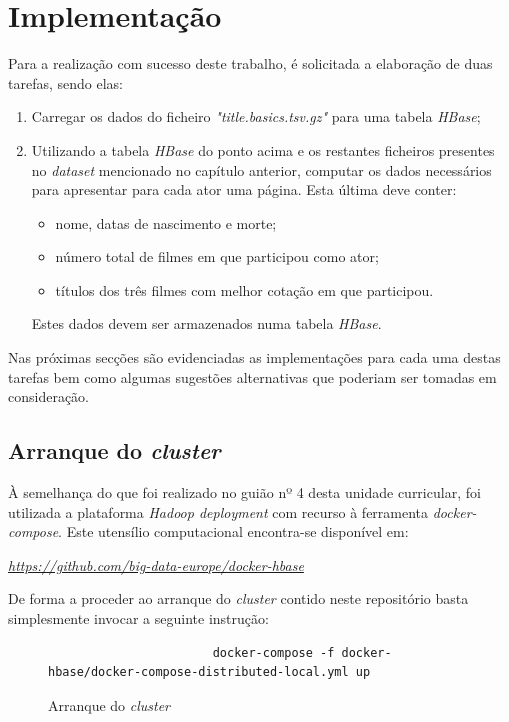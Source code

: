 \documentclass[a4paper]{report}
\begin{document}
\chapter{Implementação} \label{ch:Implementation}
\large {
	Para a realização com sucesso deste trabalho, é solicitada a elaboração de duas tarefas, sendo elas:
	\begin{enumerate}
		\item Carregar os dados do ficheiro \textit{"title.basics.tsv.gz"} para uma tabela \textit{HBase};
		\item Utilizando a tabela \textit{HBase} do ponto acima e os restantes ficheiros presentes no \textit{dataset} mencionado no capítulo anterior, computar os dados necessários para apresentar para cada ator uma página. Esta última deve conter:
		\begin{itemize}
			\item nome, datas de nascimento e morte;
			\item número total de filmes em que participou como ator;
			\item títulos dos três filmes com melhor cotação em que participou.
		\end{itemize}
		Estes dados devem ser armazenados numa tabela \textit{HBase}.
	\end{enumerate}
	
	Nas próximas secções são evidenciadas as implementações para cada uma destas tarefas bem como algumas sugestões alternativas que poderiam ser tomadas em consideração.
	
	\section{Arranque do \textit{cluster}} \label{sec:Cluster}
		À semelhança do que foi realizado no guião nº 4 desta unidade curricular, foi utilizada a plataforma \textit{Hadoop deployment} com recurso à ferramenta \textit{docker-compose}. Este utensílio computacional encontra-se disponível em:
		\begin{center}
			\textit{\url{https://github.com/big-data-europe/docker-hbase}}
		\end{center}

		De forma a proceder ao arranque do \textit{cluster} contido neste repositório basta simplesmente invocar a seguinte instrução:
		\begin{figure}[H]
			{
				\color{teal}
				\begin{verbatim}
				       docker-compose -f docker-hbase/docker-compose-distributed-local.yml up
				\end{verbatim}
			}
			\caption{Arranque do \textit{cluster}}
            \label{fig:1}
		\end{figure}

}
\end{document}
